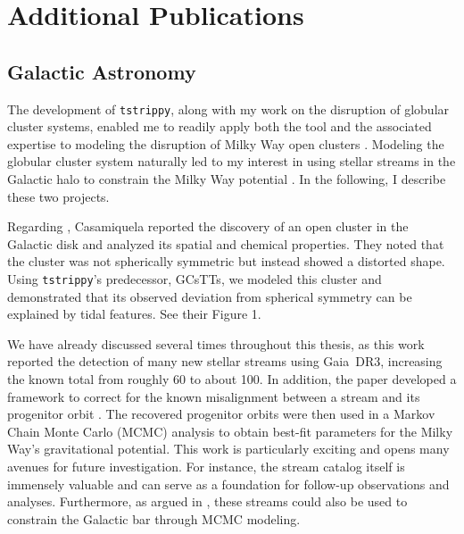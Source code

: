 \section{Additional Publications}
    \subsection*{Galactic Astronomy}

        The development of \texttt{tstrippy}, along with my work on the disruption of globular cluster systems, enabled me to readily apply both the tool and the associated expertise to modeling the disruption of Milky Way open clusters \citep{2022A&A...664A..31C}. Modeling the globular cluster system naturally led to my interest in using stellar streams in the Galactic halo to constrain the Milky Way potential \citep{2024ApJ...967...89I}. In the following, I describe these two projects. 

        Regarding \citet{2022A&A...664A..31C}, Casamiquela reported the discovery of an open cluster in the Galactic disk and analyzed its spatial and chemical properties. They noted that the cluster was not spherically symmetric but instead showed a distorted shape. Using \texttt{tstrippy}'s predecessor, GCsTTs, we modeled this cluster and demonstrated that its observed deviation from spherical symmetry can be explained by tidal features. See their Figure 1.

        We have already discussed \citet{2024ApJ...967...89I} several times throughout this thesis, as this work reported the detection of many new stellar streams using Gaia~DR3, increasing the known total from roughly 60 to about 100. In addition, the paper developed a framework to correct for the known misalignment between a stream and its progenitor orbit \citep{2007ApJ...659.1212M,2013MNRAS.433.1813S}. The recovered progenitor orbits were then used in a Markov Chain Monte Carlo (MCMC) analysis to obtain best-fit parameters for the Milky Way's gravitational potential. This work is particularly exciting and opens many avenues for future investigation. For instance, the stream catalog itself is immensely valuable and can serve as a foundation for follow-up observations and analyses. Furthermore, as argued in \citet{2023A&A...678A.180T}, these streams could also be used to constrain the Galactic bar through MCMC modeling.


